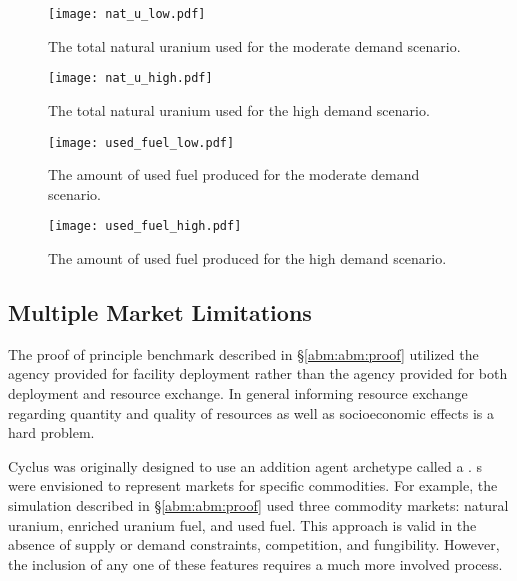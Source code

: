 \begin{figure}
\begin{center}
  \texttt{[image: nat\_u\_low.pdf]}
  \caption{The total natural uranium used for the moderate demand scenario.}
  \label{fig:nat_u_low}
\end{center}  
\end{figure}

\begin{figure}
\begin{center}
  \texttt{[image: nat\_u\_high.pdf]}
  \caption{The total natural uranium used for the high demand scenario.}
  \label{fig:nat_u_high}
\end{center}  
\end{figure}

\begin{figure}
  \begin{center}
    \texttt{[image: used\_fuel\_low.pdf]}
    \caption{The amount of used fuel produced for the moderate demand scenario.}
    \label{fig:used_fuel_low}
  \end{center}  
\end{figure}

\begin{figure}
  \begin{center}
    \texttt{[image: used\_fuel\_high.pdf]}
    \caption{The amount of used fuel produced for the high demand scenario.}
    \label{fig:used_fuel_high}
  \end{center}  
\end{figure}

\subsection{Multiple Market Limitations}\label{abm:abm:limits}

The proof of principle benchmark described in \S \ref{abm:abm:proof} utilized
the agency provided for facility deployment rather than the agency provided for
both deployment and resource exchange. In general informing resource exchange
regarding quantity and quality of resources as well as socioeconomic effects is
a hard problem.

Cyclus was originally designed to use an addition agent archetype called a
. s were envisioned to represent markets for specific
commodities. For example, the simulation described in \S \ref{abm:abm:proof}
used three commodity markets: natural uranium, enriched uranium fuel, and used
fuel. This approach is valid in the absence of supply or demand constraints,
competition, and fungibility. However, the inclusion of any one of these
features requires a much more involved process.

